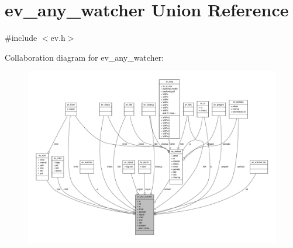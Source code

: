 \hypertarget{unionev__any__watcher}{\section{ev\-\_\-any\-\_\-watcher \-Union \-Reference}
\label{unionev__any__watcher}
}


{\ttfamily \#include $<$ev.\-h$>$}



\-Collaboration diagram for ev\-\_\-any\-\_\-watcher\-:
\nopagebreak
\begin{figure}[H]
\begin{center}
\leavevmode
\includegraphics[width=350pt]{unionev__any__watcher__coll__graph}
\end{center}
\end{figure}
